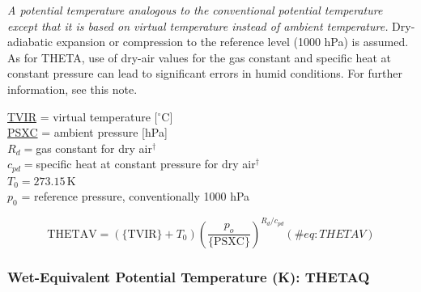 \documentclass[
  english,
]{book}
\begin{document}
\emph{A potential temperature analogous to the conventional potential
temperature except that it is based on virtual temperature instead of
ambient temperature.} Dry-adiabatic expansion or compression to the
reference level (1000 hPa) is assumed. As for THETA, use of dry-air
values for the gas constant and specific heat at constant pressure can
lead to significant errors in humid conditions. For further information,
see this note.

\protect\hyperlink{TVIR}{TVIR} = virtual temperature
{[}\(^{\circ}\mathrm{C}\){]}\\
\protect\hyperlink{psx}{PSXC} = ambient pressure {[}hPa{]}\\
\(R_{d}=\)gas constant for dry air\(^{\dagger}\)\\
\(c_{pd}=\)specific heat at constant pressure for dry
air\(^{\dagger}\)\\
\(T_{0}=273.15\,\)K\\
\(p_{0}\) = reference pressure, conventionally 1000 hPa

\begin{equation}
\mathrm{THETAV}=\left(\mathrm{\{TVIR\}}+T_{0}\right)\left(\frac{p_{o}}{\mathrm{\{PSXC\}}}\right)^{R_{d}/c_{pd}}
(\#eq:THETAV)
\end{equation}

\hypertarget{thetaq}{%
\subsubsection*{Wet-Equivalent Potential Temperature (K):
THETAQ}\label{thetaq}}
\end{document}

